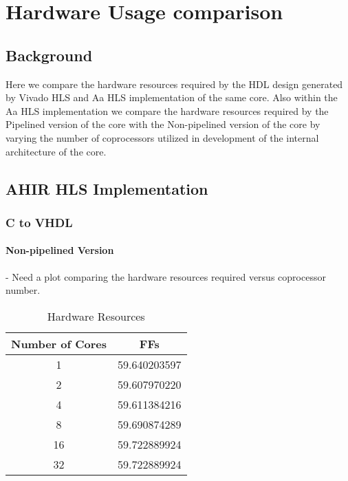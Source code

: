 \chapter{Hardware Usage comparison}

\section{Background}

Here we compare the hardware resources required by the HDL design generated by Vivado HLS and Aa HLS implementation of the same core.
Also within the Aa HLS implementation we compare the hardware resources required by the Pipelined version of the core with the Non-pipelined
version of the core by varying the number of coprocessors utilized in development of the internal architecture of the core.


\section{AHIR HLS Implementation}

\subsection{C to VHDL}

\subsubsection*{Non-pipelined Version}

- Need a plot comparing the hardware resources required versus coprocessor number.\\

\begin{table}[H]
\centering
\begin{tabular}{c | c}
\hline
Number of Cores & FFs \\
\hline
1 & 59.640203597 \\
2 & 59.607970220 \\
4 & 59.611384216 \\
8 & 59.690874289 \\
16 & 59.722889924\\
32 & 59.722889924
\end{tabular}
\caption{Hardware Resources}
\end{table}


